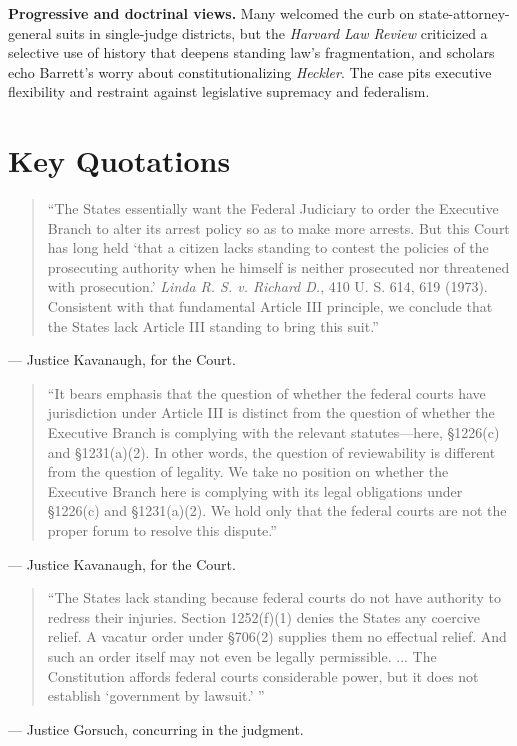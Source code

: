 \documentclass[12pt]{article}
\begin{document}
\textbf{Progressive and doctrinal views.} Many welcomed the curb on state-attorney-general suits in single-judge districts, but the \textit{Harvard Law Review} criticized a selective use of history that deepens standing law's fragmentation, and scholars echo Barrett's worry about constitutionalizing \textit{Heckler}. The case pits executive flexibility and restraint against legislative supremacy and federalism.

\section{Key Quotations}

\begin{quote}
``The States essentially want the Federal Judiciary to order the Executive Branch to alter its arrest policy so as to make more arrests. But this Court has long held `that a citizen lacks standing to contest the policies of the prosecuting authority when he himself is neither prosecuted nor threatened with prosecution.' \textit{Linda R. S. v. Richard D.}, 410 U. S. 614, 619 (1973). Consistent with that fundamental Article III principle, we conclude that the States lack Article III standing to bring this suit.''
\end{quote}
\noindent --- Justice Kavanaugh, for the Court.

\begin{quote}
``It bears emphasis that the question of whether the federal courts have jurisdiction under Article III is distinct from the question of whether the Executive Branch is complying with the relevant statutes---here, \S 1226(c) and \S 1231(a)(2). In other words, the question of reviewability is different from the question of legality. We take no position on whether the Executive Branch here is complying with its legal obligations under \S 1226(c) and \S 1231(a)(2). We hold only that the federal courts are not the proper forum to resolve this dispute.''
\end{quote}
\noindent --- Justice Kavanaugh, for the Court.

\begin{quote}
``The States lack standing because federal courts do not have authority to redress their injuries. Section 1252(f)(1) denies the States any coercive relief. A vacatur order under \S 706(2) supplies them no effectual relief. And such an order itself may not even be legally permissible. ... The Constitution affords federal courts considerable power, but it does not establish `government by lawsuit.' ''
\end{quote}
\noindent --- Justice Gorsuch, concurring in the judgment.
\end{document}
